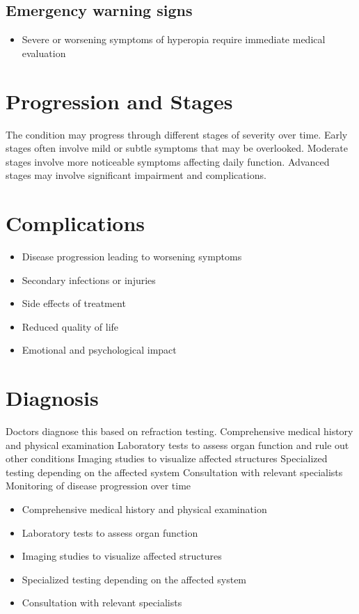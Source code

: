 \subsection{Emergency warning signs}
\begin{itemize}[noitemsep]
  \item Severe or worsening symptoms of hyperopia require immediate medical evaluation
\end{itemize}
\section{Progression and Stages}
The condition may progress through different stages of severity over time. Early stages often involve mild or subtle symptoms that may be overlooked. Moderate stages involve more noticeable symptoms affecting daily function. Advanced stages may involve significant impairment and complications.
\section{Complications}
\begin{itemize}[noitemsep]
  \item Disease progression leading to worsening symptoms
  \item Secondary infections or injuries
  \item Side effects of treatment
  \item Reduced quality of life
  \item Emotional and psychological impact
\end{itemize}
\section{Diagnosis}
Doctors diagnose this based on refraction testing. Comprehensive medical history and physical examination Laboratory tests to assess organ function and rule out other conditions Imaging studies to visualize affected structures Specialized testing depending on the affected system Consultation with relevant specialists Monitoring of disease progression over time

\begin{itemize}[noitemsep]
  \item Comprehensive medical history and physical examination
  \item Laboratory tests to assess organ function
  \item Imaging studies to visualize affected structures
  \item Specialized testing depending on the affected system
  \item Consultation with relevant specialists
\end{itemize}
